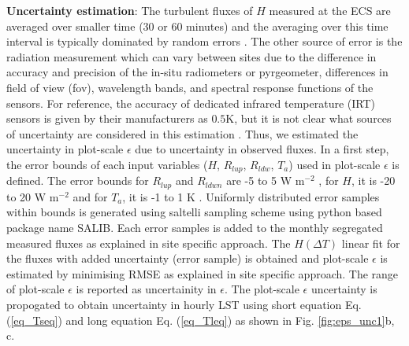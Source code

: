 \documentclass[fleqn,10pt]{wlscirep}
\begin{document}
\textbf{Uncertainty estimation}:
The turbulent fluxes of $H$ measured at the ECS are averaged over smaller time (30 or 60 minutes) and the averaging over this time interval is typically dominated by random errors \cite{rannik2016random, mauder2020surface}. The other source of error is the radiation measurement which can vary between sites due to the difference in accuracy and precision of the in-situ radiometers or pyrgeometer, differences in field of view (fov), wavelength bands, and spectral response functions of the sensors. For reference, the accuracy of dedicated infrared temperature (IRT) sensors is given by their manufacturers as $0.5$K, but it is not clear what sources of uncertainty are considered in this estimation \cite{vickers2010uncertainty}. Thus, we estimated the uncertainty in plot-scale $\epsilon$ due to uncertainty in observed fluxes. In a first step, the error bounds of each input variables ($ H$, $R_{lup}$, $R_{ldw}$, $T_{a}$) used in plot-scale $\epsilon$ is defined. The error bounds for $R_{lup}$ and $R_{ldwn}$ are -5 to 5 W m$^{-2}$ \cite{trenberth2012tracking}, for $H$, it is -20 to 20 W m$^{-2}$ and for $T_{a}$, it is -1 to 1 K \cite{foken2008energy}. Uniformly distributed error samples within bounds is generated using saltelli sampling scheme\cite{saltelli2017new} using python based package name SALIB. Each error samples is added to the monthly segregated measured fluxes as explained in site specific approach. The $H(\Delta T)$ linear fit for the fluxes with added uncertainty (error sample) is obtained and plot-scale $\epsilon$ is estimated by minimising RMSE as explained in site specific approach. The range of plot-scale $\epsilon$ is reported as uncertainity in $\epsilon$. The plot-scale $\epsilon$ uncertainty is propogated to obtain uncertainty in hourly LST using short equation Eq. (\ref{eq_Tseq}) and long equation Eq. (\ref{eq_Tleq}) as shown in Fig. \ref{fig:eps_unc1}b, c. 
\end{document}
